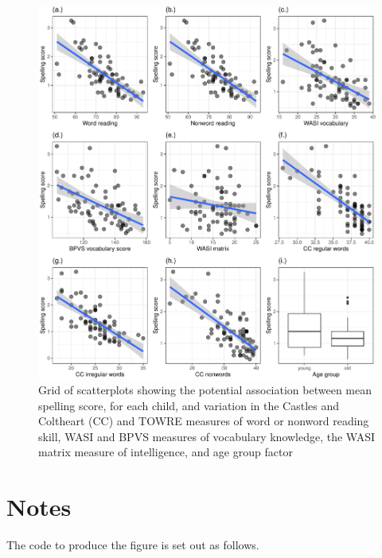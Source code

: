 \documentclass[
  letterpaper,
  DIV=11,
  numbers=noendperiod]{scrreprt}
\begin{document}
\begin{figure}

{\centering \includegraphics{visualization_files/figure-pdf/fig-distribution-scatter-grid-1.pdf}

}

\caption{\label{fig-distribution-scatter-grid}Grid of scatterplots
showing the potential association between mean spelling score, for each
child, and variation in the Castles and Coltheart (CC) and TOWRE
measures of word or nonword reading skill, WASI and BPVS measures of
vocabulary knowledge, the WASI matrix measure of intelligence, and age
group factor}

\end{figure}

\section{Notes}

The code to produce the figure is set out as follows.
\end{document}
